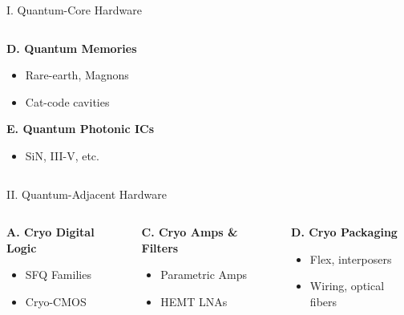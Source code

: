 \documentclass[aspectratio=169]{beamer}
\begin{document}
\begin{frame}[fragile]
\begin{block}{I. Quantum-Core Hardware}
\begin{columns}[T,totalwidth=\textwidth]
\begin{column}{0.33\textwidth}
            \textbf{D. Quantum Memories}
            \begin{itemize}
                \item Rare-earth, Magnons
                \item Cat-code cavities
            \end{itemize}
            \vspace{1em}
            \textbf{E. Quantum Photonic ICs}
            \begin{itemize}
                \item SiN, III-V, etc.
            \end{itemize}
        \end{column}
    \end{columns}
    \end{block}

    \begin{block}{II. Quantum-Adjacent Hardware}
    \footnotesize
    \begin{columns}[T,totalwidth=\textwidth]
        \begin{column}{0.33\textwidth}
            \textbf{A. Cryo Digital Logic}
            \begin{itemize}
                \item SFQ Families
                \item Cryo-CMOS
            \end{itemize}
        \end{column}
        \begin{column}{0.33\textwidth}
            \textbf{C. Cryo Amps \& Filters}
            \begin{itemize}
                \item Parametric Amps
                \item HEMT LNAs
            \end{itemize}
        \end{column}
        \begin{column}{0.33\textwidth}
            \textbf{D. Cryo Packaging}
            \begin{itemize}
                \item Flex, interposers
                \item Wiring, optical fibers
            \end{itemize}
        \end{column}
    \end{columns}
    \end{block}
\end{frame}
\end{document}
